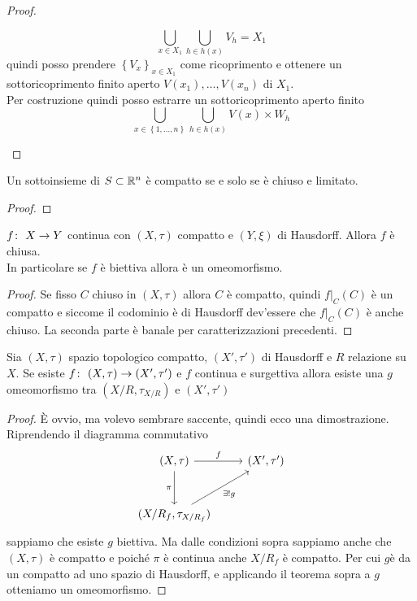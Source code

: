\begin{proof}
\begin{enumerate}
		\begin{equation*}
			\bigcup_{x \in X_1} \bigcup_{h \in h(x)} V_h = X_1
		\end{equation*} 
		quindi posso prendere $\left\{V_x\right\}_{x \in X_1}$ come ricoprimento e ottenere un sottoricoprimento finito aperto $V(x_1), \dots, V(x_n)$ di $X_1$. \\
		Per costruzione quindi posso estrarre un sottoricoprimento aperto finito  
		\begin{equation*}
			\bigcup_{x \in \left\{1,\dots, n\right\}} \bigcup_{h \in h(x)} V(x) \times W_h
		\end{equation*}
	\end{enumerate}
\end{proof}

\begin{corollary}
	Un sottoinsieme di $S \subset \mathbb{R}^n$ è compatto se e solo se è chiuso e limitato. 
\end{corollary} 
\begin{proof}
\end{proof}

\begin{theorem}
	$f \colon\ X \rightarrow Y$ continua con $(X, \tau)$ compatto e $(Y, \xi)$ di Hausdorff. Allora $f$ è chiusa. \\ In particolare se $f$ è biettiva allora è un omeomorfismo. 
\end{theorem} 
\begin{proof}
	Se fisso $C$ chiuso in $(X,\tau)$ allora $C$ è compatto, quindi $f|_C(C)$ è un compatto e siccome il codominio è di Hausdorff dev'essere che $f|_C(C)$ è anche chiuso. La seconda parte è banale per caratterizzazioni precedenti.
\end{proof}

\begin{corollary}
	\label{thr:freeomeombyquo}
	Sia $(X, \tau)$ spazio topologico compatto, $(X', \tau')$ di Hausdorff e $R$ relazione su $X$. Se esiste $f \colon\ (X, \tau) \rightarrow (X', \tau')$ e $f$ continua e surgettiva allora esiste una $g$ omeomorfismo tra $(X/R,\tau_{X/R})$ e $(X', \tau')$
\end{corollary}
\begin{proof}
	È ovvio, ma volevo sembrare saccente, quindi ecco una dimostrazione.
	Riprendendo il diagramma commutativo 
	\begin{equation*}
		\begin{tikzcd}[row sep = 3em]
			(X, \tau) \arrow[swap]{d}{\pi} \arrow{r}{f} & (X', \tau') \\
			(X/R_f, \tau_{X/R_f}) \arrow[swap]{ru}{\exists! g} &
		\end{tikzcd}	
	\end{equation*}
	sappiamo che esiste $g$ biettiva. Ma dalle condizioni sopra sappiamo anche che $(X,\tau)$ è compatto e poiché $\pi$ è continua anche $X/R_f$ è compatto. Per cui $g$è da un compatto ad uno spazio di Hausdorff, e applicando il teorema sopra a $g$ otteniamo un omeomorfismo. 
\end{proof}



